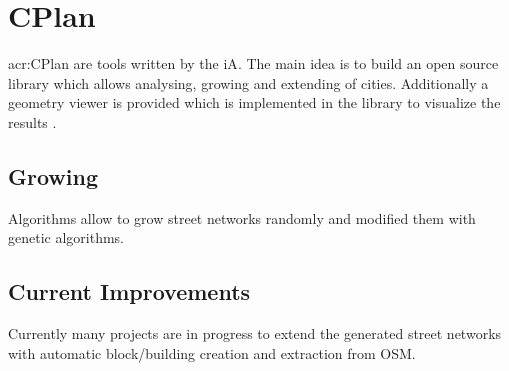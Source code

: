 \section{CPlan}
\label{CPlan}
\gls{acr:CPlan} are tools written by the \acrlong{iA}. The main idea is to build an open source library which allows analysing, growing and extending of cities. Additionally a geometry viewer is provided which is implemented in the library to visualize the results \citep{cPlan:2015}.

\subsection{Growing}
Algorithms allow to grow street networks randomly and modified them with genetic algorithms.

\subsection{Current Improvements}
Currently many projects are in progress to extend the generated street networks with automatic block/building creation and extraction from \gls{OSM}.